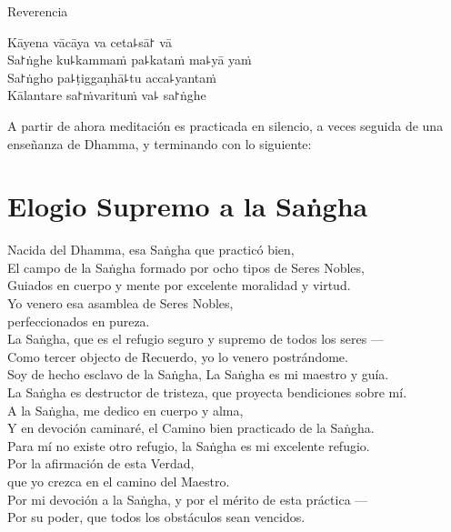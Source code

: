 \enlargethispage{\baselineskip}

\vfill

\begin{instruction}
  Reverencia
\end{instruction}

Kāyena vācāya va ceta꜕sā꜓ vā\\
Sa꜓ṅghe ku꜕kammaṁ pa꜕kataṁ ma꜕yā yaṁ\\
Sa꜓ṅgho pa꜕ṭiggaṇhā꜕tu acca꜕yantaṁ\\
Kālantare sa꜓ṁvarituṁ va꜕ sa꜓ṅghe

\vfill

\begin{instruction}
  A partir de ahora meditación es practicada en silencio, a veces seguida de una enseñanza de Dhamma, y terminando con lo siguiente:
\end{instruction}

\clearpage

\nextChapterUseDelegatedPageNumber

\chapter{Elogio Supremo a la Saṅgha}

\begin{leader}
\end{leader}

Nacida del Dhamma, esa Saṅgha que practicó bien,\\
El campo de la Saṅgha formado por ocho tipos de Seres Nobles,\\
Guiados en cuerpo y mente por excelente moralidad y virtud.\\
Yo venero esa asamblea de Seres Nobles,\\
\vin perfeccionados en pureza.\\
La Saṅgha, que es el refugio seguro y supremo de todos los seres ---\\
Como tercer objecto de Recuerdo, yo lo venero postrándome.\\
Soy de hecho esclavo de la Saṅgha, La Saṅgha es mi maestro y guía.\\
La Saṅgha es destructor de tristeza, que proyecta bendiciones sobre mí.\\
A la Saṅgha, me dedico en cuerpo y alma,\\
Y en devoción caminaré, el Camino bien practicado de la Saṅgha.\\
Para mí no existe otro refugio, la Saṅgha es mi excelente refugio.\\
Por la afirmación de esta Verdad,\\
\vin que yo crezca en el camino del Maestro.\\
Por mi devoción a la Saṅgha, y por el mérito de esta práctica ---\\
Por su poder, que todos los obstáculos sean vencidos.

